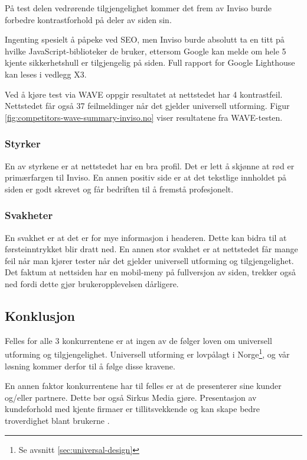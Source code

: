 På test delen vedrørende tilgjengelighet kommer det frem av Inviso burde forbedre kontrastforhold på deler av siden sin.

Ingenting spesielt å påpeke ved SEO, men Inviso burde absolutt ta en titt på hvilke JavaScript-biblioteker de bruker, ettersom Google kan melde om hele 5 kjente sikkerhetshull er tilgjengelig på siden. Full rapport for Google Lighthouse kan leses i vedlegg X3.

Ved å kjøre test via WAVE oppgir resultatet at nettstedet har 4 kontrastfeil. Nettstedet får også 37 feilmeldinger når det gjelder universell utforming. Figur \ref{fig:competitors-wave-summary-inviso.no} viser resultatene fra WAVE-testen.

\subsubsection{Styrker} 
En av styrkene er at nettstedet har en bra profil. Det er lett å skjønne at rød er primærfargen til Inviso. En annen positiv side er at det tekstlige innholdet på siden er godt skrevet og får bedriften til å fremstå profesjonelt.

\subsubsection{Svakheter}
En svakhet er at det er for mye informasjon i headeren. Dette kan bidra til at førsteinntrykket blir dratt ned. En annen stor svakhet er at nettstedet får mange feil når man kjører tester når det gjelder universell utforming og tilgjengelighet. Det faktum at nettsiden har en mobil-meny på fullversjon av siden, trekker også ned fordi dette gjør brukeropplevelsen dårligere.

\subsection{Konklusjon}
Felles for alle 3 konkurrentene er at ingen av de følger loven om universell utforming og tilgjengelighet. Universell utforming er lovpålagt i Norge\footnote{Se avsnitt \ref{sec:universal-design}}, og vår løsning kommer derfor til å følge disse kravene. 

En annen faktor konkurrentene har til felles er at de presenterer sine kunder og/eller partnere. Dette bør også Sirkus Media gjøre. Presentasjon av kundeforhold med kjente firmaer er tillitsvekkende og kan skape bedre troverdighet blant brukerne \cite{vitaldesign_client_logos}.

